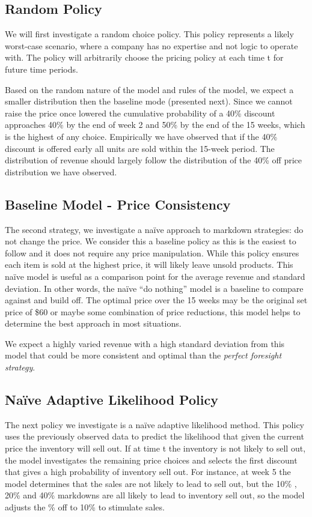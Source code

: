 \documentclass[11pt,a4paper]{article}
\begin{document}
\subsection{Random Policy}
We will first investigate a random choice policy. 
This policy represents a likely worst-case scenario, where a company has no expertise and not logic to operate with. 
The policy will arbitrarily choose the pricing policy at each time t for future time periods.

Based on the random nature of the model and rules of the model, we expect a smaller distribution then the baseline mode (presented next). 
Since we cannot raise the price once lowered the cumulative probability of a 40\% discount approaches 40\% by the end of week 2 and 50\% by the end of the 15 weeks, which is the highest of any choice. 
Empirically we have observed that if the 40\% discount is offered early all units are sold within the 15-week period. 
The distribution of revenue should largely follow the distribution of the 40\% off price distribution we have observed.

\subsection{Baseline Model - Price Consistency}
The second strategy, we investigate a naïve approach to markdown strategies: do not change the price. 
We consider this a baseline policy as this is the easiest to follow and it does not require any price manipulation. 
While this policy ensures each item is sold at the highest price, it will likely leave unsold products. 
This naïve model is useful as a comparison point for the average revenue and standard deviation. 
In other words, the naïve “do nothing” model is a baseline to compare against and build off. 
The optimal price over the 15 weeks may be the original set price of \$60 or maybe some combination of price reductions, this model helps to determine the best approach in most situations.

We expect a highly varied revenue with a high standard deviation from this model that could be more consistent and optimal than the \emph{perfect foresight strategy}.

\subsection{Naïve Adaptive Likelihood Policy}
The next policy we investigate is a naïve adaptive likelihood method. 
This policy uses the previously observed data to predict the likelihood that given the current price the inventory will sell out. 
If at time t the inventory is not likely to sell out, the model investigates the remaining price choices and selects the first discount that gives a high probability of inventory sell out. 
For instance, at week 5 the model determines that the sales are not likely to lead to sell out, but the 10\% , 20\% and 40\% markdowns are all likely to lead to inventory sell out, so the model adjusts the \% off to 10\% to stimulate sales. 
\end{document}
